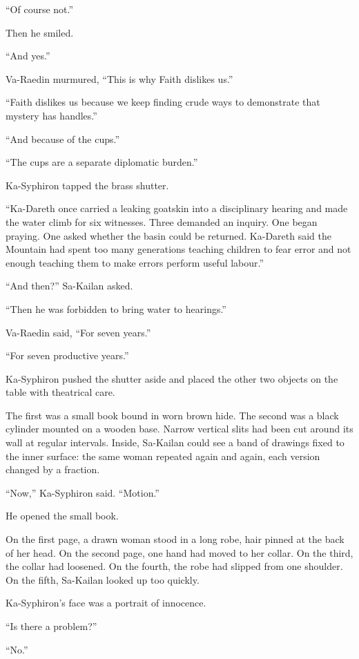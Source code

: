 “Of course not.”\par
Then he smiled.\par
“And yes.”\par
Va-Raedin murmured, “This is why Faith dislikes us.”\par
“Faith dislikes us because we keep finding crude ways to demonstrate that mystery has handles.”\par
“And because of the cups.”\par
“The cups are a separate diplomatic burden.”\par
Ka-Syphiron tapped the brass shutter.\par
“Ka-Dareth once carried a leaking goatskin into a disciplinary hearing and made the water climb for six witnesses. Three demanded an inquiry. One began praying. One asked whether the basin could be returned. Ka-Dareth said the Mountain had spent too many generations teaching children to fear error and not enough teaching them to make errors perform useful labour.”\par
“And then?” Sa-Kailan asked.\par
“Then he was forbidden to bring water to hearings.”\par
Va-Raedin said, “For seven years.”\par
“For seven productive years.”\par
Ka-Syphiron pushed the shutter aside and placed the other two objects on the table with theatrical care.\par
The first was a small book bound in worn brown hide. The second was a black cylinder mounted on a wooden base. Narrow vertical slits had been cut around its wall at regular intervals. Inside, Sa-Kailan could see a band of drawings fixed to the inner surface: the same woman repeated again and again, each version changed by a fraction.\par
“Now,” Ka-Syphiron said. “Motion.”\par
He opened the small book.\par
On the first page, a drawn woman stood in a long robe, hair pinned at the back of her head. On the second page, one hand had moved to her collar. On the third, the collar had loosened. On the fourth, the robe had slipped from one shoulder. On the fifth, Sa-Kailan looked up too quickly.\par
Ka-Syphiron’s face was a portrait of innocence.\par
“Is there a problem?”\par
“No.”\par
